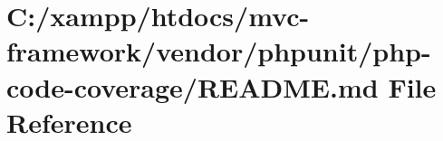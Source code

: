 \hypertarget{vendor_2phpunit_2php-code-coverage_2_r_e_a_d_m_e_8md}{}\section{C\+:/xampp/htdocs/mvc-\/framework/vendor/phpunit/php-\/code-\/coverage/\+R\+E\+A\+D\+ME.md File Reference}
\label{vendor_2phpunit_2php-code-coverage_2_r_e_a_d_m_e_8md}
